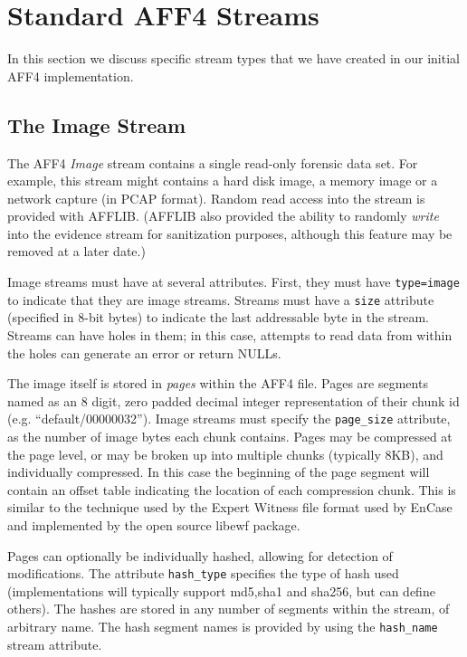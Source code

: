 \documentclass[10pt, conference]{IEEEtran}
\begin{document}
\section{Standard AFF4 Streams}
In this section we discuss specific stream types that we have created
in our initial AFF4 implementation. 

\subsection{The Image Stream}
\label{image_stream}
The AFF4 \emph{Image} stream contains a single read-only forensic data
set. For example, this stream might contains a hard
disk image, a memory image or a network capture (in PCAP
format). Random read access into the stream is provided with
AFFLIB. (AFFLIB also provided the ability to randomly \emph{write}
into the evidence stream for sanitization purposes, although this
feature may be removed at a later date.) 

Image streams must have at several attributes. First, they must have
\texttt{type=image} to indicate that they are image streams. Streams
must have a \texttt{size} attribute (specified in 8-bit bytes) to
indicate the last addressable byte in the stream. Streams can have
holes in them; in this case, attempts to read data from within the
holes can generate an error or return NULLs.

The image itself is stored in \emph{pages} within the AFF4 file. Pages are
segments named as an 8 digit, zero padded decimal integer
representation of their chunk id (e.g. ``default/00000032''). Image
streams must specify the \texttt{page\_size} attribute, as the number of
image bytes each chunk contains. Pages may be compressed at the
page level, or may be broken up into multiple chunks (typically 8KB),
and individually compressed. In this case the beginning of the page
segment will contain an offset table indicating the location of each
compression chunk. This is similar to the technique used by the Expert
Witness file format used by EnCase\cite{encase-3.0} and implemented by
the open source libewf\cite{libewf} package.

Pages can optionally be individually hashed, allowing for detection
of modifications. The attribute \texttt{hash\_type} specifies the type of
hash used (implementations will typically support md5,sha1 and sha256, but can
define others). The hashes are stored in any number of segments within
the stream, of arbitrary name. The hash segment names is provided by
using the \texttt{hash\_name} stream attribute.
\end{document}
